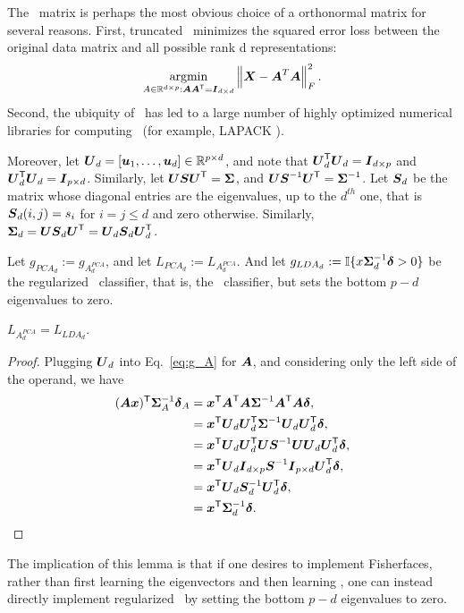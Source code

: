 \documentclass[10pt]{article}
\begin{document}
The \Pca~matrix is perhaps the most obvious choice of a orthonormal matrix for several reasons.  First, truncated \Pca~minimizes the squared error loss between the original data matrix and all possible rank d representations:
\begin{align*}
\argmin_{A \in \Real^{d \times p} : \bA \bA\T = \bI_{d \times d}} \norm{ \bX - \bA^T \bA }_F^2.
\end{align*}
Second, the ubiquity of \Pca~has led to a large number of highly optimized numerical libraries for computing \Pca~(for example, LAPACK \cite{Anderson1999}). 

Moreover, let $\bU_d=[\bu_1,\ldots,\bu_d] \in \Real^{p \times d}$, and note that $\bU_d\T \bU_d = \bI_{d \times p}$ and $\bU_d\T \bU_d  = \bI_{p \times d}$.  Similarly, let $\bU \bS \bU\T = \bSig$, and $\bU \bS^{-1} \bU\T = \bSig^{-1}$.  Let $\bS_d$ be the matrix whose diagonal entries are the eigenvalues, up to the $d^{th}$ one, that is $\bS_d(i,j)=s_i$ for $i=j \leq d$ and zero otherwise.  Similarly, $\bSig_d=\bU \bS_d \bU\T=\bU_d \bS_d \bU_d\T$. 

Let $g_{PCA_d}:=g_{A^{PCA}_d}$, and let $L_{PCA_d}:=L_{A^{PCA}_d}$.   
And let $g_{LDA_d} := \II \{ x \bSig_d^{-1} \bdel > 0\}$ be the regularized \Lda~classifier, that is, the \Lda~classifier, but sets the bottom $p-d$ eigenvalues to zero.

\begin{lem}
$L_{A^{PCA}_d} = L_{LDA_d}$.
\end{lem}

\begin{proof}
Plugging $\bU_d$ into Eq.~\eqref{eq:g_A} for $\bA$, and considering only the left side of the operand, we have
\begin{align*}
(\bA \bx)\T \bSig^{-1}_A \bdel_A &= \bx\T \bA\T \bA \bSig^{-1} \bA\T \bA \bdel,
\\&= \bx\T  \bU_d\bU_d\T \bSig^{-1} \bU_d\bU_d\T \bdel,
\\&= \bx\T  \bU_d \bU_d\T \bU \bS^{-1} \bU \bU_d\bU_d\T \bdel,
\\&= \bx\T  \bU_d \bI_{d \times p} \bS^{-1} \bI_{p \times d} \bU_d\T \bdel,
\\&= \bx\T  \bU_d \bS^{-1}_d  \bU_d\T \bdel ,
\\&= \bx\T  \bSig^{-1}_d  \bdel.
\end{align*}
\end{proof}

The implication of this lemma is that if one desires to implement Fisherfaces, rather than first learning the eigenvectors and then learning \Fld, one can instead directly implement regularized \Fld~by setting the bottom $p-d$ eigenvalues to zero.
\end{document}
